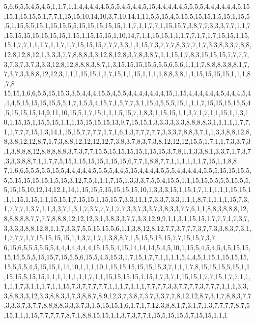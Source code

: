 5,6,6,5,5,4,5,4,5,1,1,7,1,1,4,4,4,4,4,5,5,5,4,5,4,4,5,15,4,4,4,4,4,5,5,5,5,4,4,4,4,4,4,5,15,15,1,15,15,5,1,7,7,1,15,15,10,14,10,3,7,10,14,1,11,5,5,15,4,5,15,5,15,15,1,5,15,1,15,5,5,1,15,5,5,15,1,15,15,5,5,15,15,15,15,15,1,1,7,1,1,7,7,1,15,15,7,3,8,7,7,3,3,3,7,7,1,1,7,15,15,15,15,15,15,15,1,15,1,15,15,15,1,10,14,7,1,1,15,15,1,1,1,7,7,1,7,1,7,15,15,1,15,15,1,7,7,1,1,1,7,1,1,7,1,7,15,15,15,7,7,7,3,3,1,1,15,7,3,7,7,7,8,3,7,7,1,7,3,3,8,3,3,7,8,8,12,8,12,8,12,1,3,3,3,7,7,8,8,8,3,3,12,8,12,8,3,7,8,3,8,7,1,1,15,1,7,8,3,15,15,15,7,7,7,7,3,7,3,7,3,7,3,3,3,12,8,12,8,8,8,3,8,7,1,3,15,15,15,15,5,5,5,6,5,6,1,1,1,7,8,8,8,3,8,8,1,7,7,3,7,3,3,8,8,12,12,3,1,1,1,15,15,1,1,7,15,1,1,15,1,1,1,1,8,8,3,8,1,1,15,15,15,15,1,1,1,8,7,8
15,15,1,6,6,5,5,15,15,3,3,5,4,4,4,15,5,4,5,5,4,4,4,4,4,4,4,15,1,15,4,4,4,4,4,4,5,4,4,4,5,4,4,4,5,15,15,15,15,5,5,1,7,1,5,5,4,15,7,1,5,7,7,3,1,15,4,5,5,5,15,1,1,1,7,15,15,15,15,5,4,5,15,15,15,14,9,11,10,15,5,1,7,15,1,1,1,5,15,7,1,8,3,1,15,15,1,1,3,7,1,7,1,1,15,1,1,3,10,1,15,15,1,15,5,15,1,1,1,15,15,15,15,13,9,7,15,15,1,3,3,3,3,3,3,8,8,8,8,3,1,1,1,1,1,7,7,1,1,7,7,7,15,1,3,14,1,15,15,7,7,7,7,1,7,1,6,1,3,7,7,7,7,7,3,3,3,7,8,8,3,7,1,1,3,3,8,8,12,8,8,3,8,12,12,8,7,1,7,3,8,8,12,12,12,12,7,3,8,3,7,8,3,7,3,8,12,12,12,15,5,1,7,1,1,7,3,3,7,3,1,3,8,8,8,12,8,8,8,8,8,3,7,3,7,7,15,5,15,15,15,15,1,15,15,3,7,8,1,1,3,3,8,1,3,3,7,1,7,3,7,3,3,3,8,8,7,1,1,7,7,5,15,1,15,15,15,1,15,15,6,7,7,1,8,8,7,7,1,1,1,1,1,1,7,15,1,1,8,8
7,1,6,6,5,5,5,5,5,15,5,4,4,4,4,4,5,5,5,5,4,4,5,15,4,4,4,4,5,5,5,4,4,4,4,4,5,5,5,15,15,15,5,5,5,15,15,15,15,1,5,15,3,12,7,5,1,1,1,7,15,1,3,3,3,7,5,5,4,15,5,1,1,15,15,5,5,5,5,15,5,5,5,15,15,10,12,14,12,1,14,1,15,15,5,15,15,15,15,10,1,3,3,3,15,1,15,1,7,1,1,1,1,1,15,15,1,1,1,15,1,15,1,1,15,15,1,7,15,15,1,15,15,7,3,3,11,1,7,3,3,7,3,3,1,1,1,8,7,1,1,1,1,15,7,3,1,7,7,7,1,3,7,1,1,3,3,7,1,3,1,7,3,7,7,7,1,7,7,3,3,7,3,3,7,3,8,3,3,7,7,6,1,1,8,8,3,8,8,8,12,8,8,8,8,8,7,7,7,7,8,8,8,12,12,12,3,1,3,8,3,3,7,7,3,3,12,9,9,1,1,3,1,15,15,1,7,7,7,1,7,3,7,3,3,3,3,8,8,12,8,1,1,7,3,3,7,5,5,15,15,5,6,1,1,3,8,12,8,12,7,7,3,7,7,7,3,7,7,3,3,8,3,7,3,1,1,7,7,7,1,7,15,15,15,15,1,1,3,7,1,7,1,3,8,8,7,1,5,15,5,15,15,7,7,15,15,7,3,7
6,15,6,5,5,5,5,5,5,4,4,4,4,4,4,4,15,15,5,4,15,14,14,14,5,4,5,10,1,15,5,4,5,4,5,4,5,15,15,15,15,5,5,5,15,15,7,15,5,5,6,15,5,4,5,15,3,1,7,15,1,7,7,1,1,1,1,5,4,4,5,1,15,1,15,15,15,15,5,5,5,4,5,15,15,1,14,10,1,1,1,10,1,15,15,15,15,15,15,3,7,1,1,1,7,8,15,15,15,5,15,1,1,15,15,5,15,15,1,1,1,1,1,1,1,1,7,1,1,15,15,15,15,1,15,1,7,3,7,1,15,15,1,7,7,15,1,7,7,1,1,1,1,1,7,3,1,1,1,7,1,1,15,7,3,7,7,7,7,7,1,1,1,7,1,1,1,7,7,7,7,3,3,7,7,7,7,3,7,7,7,1,1,1,3,3,3,8,8,3,3,12,3,3,8,8,3,3,7,3,8,8,7,8,9,12,3,7,3,8,7,3,7,3,3,7,7,8,12,12,8,7,3,1,7,8,8,3,7,7,3,3,3,7,3,7,7,8,8,8,8,3,3,3,7,3,1,5,15,15,1,6,1,7,1,7,12,3,8,8,1,7,3,1,7,1,3,7,7,7,7,8,7,5,15,1,1,1,15,7,7,7,7,7,8,7,1,8,8,15,15,1,1,3,7,3,7,7,1,15,5,15,15,5,7,15,15,1,1,1
